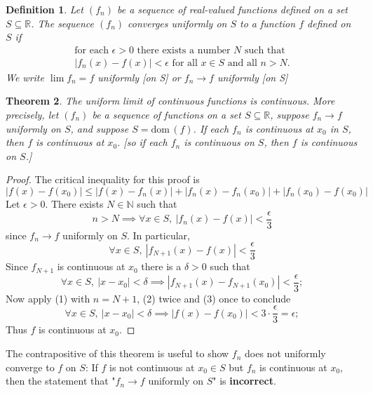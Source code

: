 \documentclass[12pt, lettersize]{book}
\newtheorem{thm}{Theorem}[section]
\newtheorem{dfn}[thm]{Definition}
\newcommand{\R}{\mathbb{R}}
\newcommand{\N}{\mathbb{N}}
\newcommand{\dom}{\text{dom}\,}
\begin{document}
	\begin{dfn}
		Let $(f_n)$ be a sequence of real-valued functions defined on a set $S\subseteq\R$. The sequence $(f_n)$ \emph{converges uniformly} on $S$ to a function $f$ defined on $S$ if
		\begin{align*}
			\text{for each $\epsilon>0$ there exists a number $N$ such that}\\
			\text{$|f_n(x)-f(x)|<\epsilon$ for all $x\in S$ and all $n>N$.}
		\end{align*}
		We write $\lim f_n=f$ \emph{uniformly [on S]} or $f_n\rightarrow f$ \emph{uniformly [on S]}
	\end{dfn}
	
	\setcounter{equation}{0}
	\begin{thm}\label{thm:24.3}
		The uniform limit of continuous functions is continuous. More precisely, let $(f_n)$ be a sequence of functions
		on a set $S\subseteq\R$, suppose $f_n\rightarrow f$ uniformly on $S$, and suppose $S=\dom(f)$. If each $f_n$ is
		continuous at $x_0$ in $S$, then $f$ is continuous at $x_0$. [so if each $f_n$ is continuous on $S$, then $f$ is continuous on $S$.]
	\end{thm}
	\begin{proof}
		The critical inequality for this proof is
		\begin{equation}
			|f(x)-f(x_0)|\leq|f(x)-f_n(x)|+|f_n(x)-f_n(x_0)|+|f_n(x_0)-f(x_0)|
		\end{equation}
		Let $\epsilon>0$. There exists $N\in\N$ such that
		\begin{displaymath}
			n>N\implies \forall x\in S,\ |f_n(x)-f(x)|<\frac{\epsilon}{3}
		\end{displaymath}
		since $f_n\rightarrow f$ uniformly on $S$. In particular,
		\begin{equation}
			\forall x\in S,\ |f_{N+1}(x)-f(x)|<\frac{\epsilon}{3}
		\end{equation}
		Since $f_{N+1}$ is continuous at $x_0$ there is a $\delta>0$ such that
		\begin{equation}
			\forall x\in S,\ |x-x_0|<\delta\implies|f_{N+1}(x)-f_{N+1}(x_0)|<\frac{\epsilon}{3};
		\end{equation}
		Now apply (1) with $n=N+1$, (2) twice and (3) once to conclude
		\begin{displaymath}
			\forall x\in S,\ |x-x_0|<\delta\implies|f(x)-f(x_0)|<3\cdot\frac{\epsilon}{3}=\epsilon;
		\end{displaymath}
		Thus $f$ is continuous at $x_0$.
	\end{proof}
	The contrapositive of this theorem is useful to show $f_n$ does not uniformly converge to $f$ on $S$:
	If $f$ is not continuous at $x_0\in S$ but $f_n$ is continuous at $x_0$, then the statement that "$f_n\rightarrow f$ uniformly on $S$" is \textbf{incorrect}.
	
\end{document}
